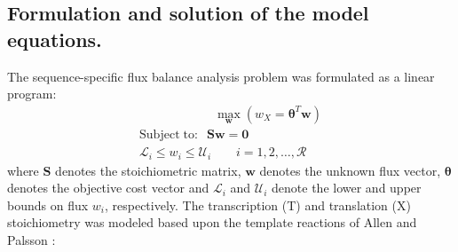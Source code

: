 \documentclass[journal=asbcd6,manuscript=article]{achemso}
\begin{document}
\subsection*{Formulation and solution of the model equations.}
The sequence-specific flux balance analysis problem was formulated as a linear program:
\begin{equation}
 \begin{multlined}
	\qquad \qquad \qquad \max_{\boldsymbol{w}}{} \! \left( w_{X} = \mathbf{\boldsymbol{\theta}}^T \boldsymbol{w} \right) \\
	\mathrm{Subject \; to:}
	 \; \; \mathbf{S}\mathbf{w}=\mathbf{0} \\
\mathcal{L}_{i} \leq w_i \leq \mathcal{U}_{i}  \qquad i=1,2,\hdots,\mathcal{R}
 \end{multlined}
\end{equation}
where $\mathbf{S}$ denotes the stoichiometric matrix, $\mathbf{w}$ denotes the unknown flux vector, $\boldsymbol{\theta}$ denotes the objective cost vector
and $\mathcal{L}_{i}$ and $\mathcal{U}_{i}$ denote the lower and upper bounds on flux $w_{i}$, respectively.
The transcription (T) and translation (X) stoichiometry was modeled based upon the template reactions of Allen and Palsson \cite{Allen:2003aa}:
\end{document}
